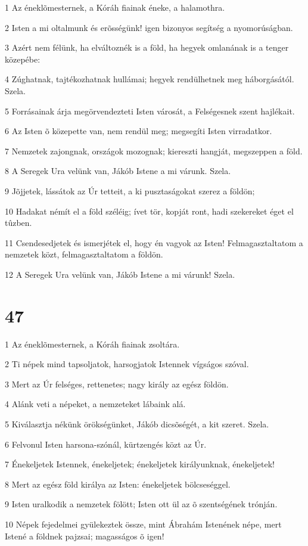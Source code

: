 \par 1 Az éneklõmesternek, a Kóráh fiainak éneke, a halamothra.
\par 2 Isten a mi oltalmunk és erõsségünk! igen bizonyos segítség a nyomorúságban.
\par 3 Azért nem félünk, ha elváltoznék is a föld, ha hegyek omlanának is a tenger közepébe:
\par 4 Zúghatnak, tajtékozhatnak hullámai; hegyek rendülhetnek meg háborgásától. Szela.
\par 5 Forrásainak árja megörvendezteti Isten városát, a Felségesnek szent hajlékait.
\par 6 Az Isten õ közepette van, nem rendül meg; megsegíti Isten virradatkor.
\par 7 Nemzetek zajongnak, országok mozognak; kiereszti hangját, megszeppen a föld.
\par 8 A Seregek Ura velünk van, Jákób Istene a mi várunk. Szela.
\par 9 Jõjjetek, lássátok az Úr tetteit, a ki pusztaságokat szerez a földön;
\par 10 Hadakat némít el a föld széléig; ívet tör, kopját ront, hadi szekereket éget el tûzben.
\par 11 Csendesedjetek és ismerjétek el, hogy én vagyok az Isten! Felmagasztaltatom a nemzetek közt, felmagasztaltatom a földön.
\par 12 A Seregek Ura velünk van, Jákób Istene a mi várunk! Szela.

\chapter{47}

\par 1 Az éneklõmesternek, a Kóráh fiainak zsoltára.
\par 2 Ti népek mind tapsoljatok, harsogjatok Istennek vígságos szóval.
\par 3 Mert az Úr felséges, rettenetes; nagy király az egész földön.
\par 4 Alánk veti a népeket, a nemzeteket lábaink alá.
\par 5 Kiválasztja nékünk örökségünket, Jákób dicsõségét, a kit szeret. Szela.
\par 6 Felvonul Isten harsona-szónál, kürtzengés közt az Úr.
\par 7 Énekeljetek Istennek, énekeljetek; énekeljetek királyunknak, énekeljetek!
\par 8 Mert az egész föld királya az Isten: énekeljetek bölcseséggel.
\par 9 Isten uralkodik a nemzetek fölött; Isten ott ül az õ szentségének trónján.
\par 10 Népek fejedelmei gyülekeztek össze, mint Ábrahám Istenének népe, mert Istené a földnek pajzsai; magasságos õ igen!


